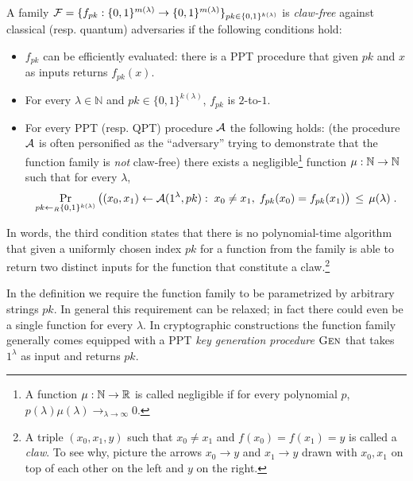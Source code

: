 \begin{definition}
A family $\mathcal{F} = \{f_{pk}: \{0,1\}^{m(\lambda)} \to \{0,1\}^{m(\lambda)}\}_{pk\in\{0,1\}^{k(\lambda)}}$ is \emph{claw-free} against classical (resp. quantum) adversaries if 
the following conditions hold:
\begin{itemize}
\item $f_{pk}$ can be efficiently evaluated: there is a PPT procedure that given $pk$ and $x$ as inputs returns $f_{pk}(x)$.
\item For every $\lambda\in \mathbb{N}$ and  $pk\in\{0,1\}^{k(\lambda)}$, $f_{pk}$ is $2$-to-$1$.
\item For every PPT (resp. QPT) procedure $\mathcal{A}$ the following holds: (the procedure $\mathcal{A}$ is often personified as the ``adversary'' trying to demonstrate that the function family is \emph{not} claw-free) there exists a negligible\footnote{A function $\mu:\mathbb{N}\to\mathbb{R}$ is called {negligible} if for every polynomial $p$, $p(\lambda)\mu(\lambda)\to_{\lambda\to\infty} 0$.} function $\mu:\mathbb{N}\to\mathbb{N}$ such that for every $\lambda$, 
\[ \Pr_{pk\leftarrow_R \{0,1\}^{k(\lambda)}}\big( (x_0,x_1)\leftarrow \mathcal{A}(1^\lambda,pk):\; x_0\neq x_1,\; f_{pk}(x_0)= f_{pk}(x_1)\big) \,\leq\, \mu(\lambda)\;.\]
\end{itemize}
\end{definition}

In words, the third condition states that there is no polynomial-time algorithm that given a uniformly chosen index $pk$ for a function from the family is able to return two distinct inputs for the function that constitute a claw.\footnote{A triple $(x_0,x_1,y)$ such that $x_0\neq x_1$ and $f(x_0)=f(x_1)=y$ is called a \emph{claw}. To see why, picture the arrows $x_0\rightarrow y$ and $x_1\rightarrow y$ drawn with $x_0,x_1$ on top of each other on the left and $y$ on the right.}

\begin{remark}
In the definition we require the function family to be parametrized by arbitrary strings $pk$. In general this requirement can be relaxed; in fact there could even be a single function for every $\lambda$. In cryptographic constructions the function family generally comes equipped with a PPT \emph{key generation procedure} $\textsc{Gen}$ that takes $1^\lambda$ as input and returns $pk$.
\end{remark}

